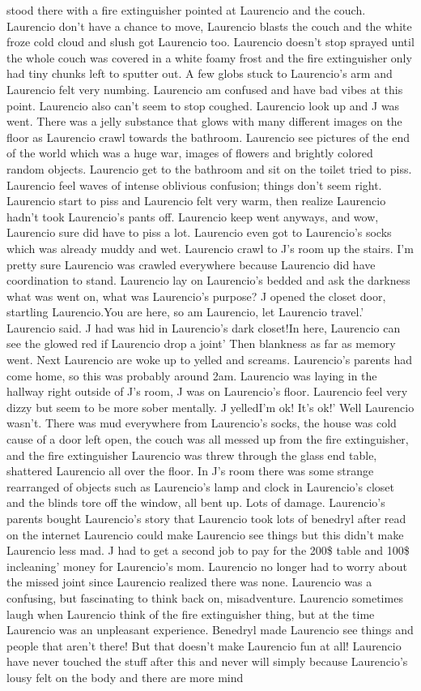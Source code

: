 \documentclass[12pt]{book}
\begin{document}
stood there with a fire extinguisher pointed at Laurencio and the couch. Laurencio don't have a chance to move, Laurencio blasts the couch and the white froze cold cloud and slush got Laurencio too. Laurencio doesn't stop sprayed until the whole couch was covered in a white foamy frost and the fire extinguisher only had tiny chunks left to sputter out. A few globs stuck to Laurencio's arm and Laurencio felt very numbing. Laurencio am confused and have bad vibes at this point. Laurencio also can't seem to stop coughed. Laurencio look up and J was went. There was a jelly substance that glows with many different images on the floor as Laurencio crawl towards the bathroom. Laurencio see pictures of the end of the world which was a huge war, images of flowers and brightly colored random objects. Laurencio get to the bathroom and sit on the toilet tried to piss. Laurencio feel waves of intense oblivious confusion; things don't seem right. Laurencio start to piss and Laurencio felt very warm, then realize Laurencio hadn't took Laurencio's pants off. Laurencio keep went anyways, and wow, Laurencio sure did have to piss a lot. Laurencio even got to Laurencio's socks which was already muddy and wet. Laurencio crawl to J's room up the stairs. I'm pretty sure Laurencio was crawled everywhere because Laurencio did have coordination to stand. Laurencio lay on Laurencio's bedded and ask the darkness what was went on, what was Laurencio's purpose? J opened the closet door, startling Laurencio.You are here, so am Laurencio, let Laurencio travel.' Laurencio said. J had was hid in Laurencio's dark closet!In here, Laurencio can see the glowed red if Laurencio drop a joint' Then blankness as far as memory went. Next Laurencio are woke up to yelled and screams. Laurencio's parents had come home, so this was probably around 2am. Laurencio was laying in the hallway right outside of J's room, J was on Laurencio's floor. Laurencio feel very dizzy but seem to be more sober mentally. J yelledI'm ok! It's ok!' Well Laurencio wasn't. There was mud everywhere from Laurencio's socks, the house was cold cause of a door left open, the couch was all messed up from the fire extinguisher, and the fire extinguisher Laurencio was threw through the glass end table, shattered Laurencio all over the floor. In J's room there was some strange rearranged of objects such as Laurencio's lamp and clock in Laurencio's closet and the blinds tore off the window, all bent up. Lots of damage. Laurencio's parents bought Laurencio's story that Laurencio took lots of benedryl after read on the internet Laurencio could make Laurencio see things but this didn't make Laurencio less mad. J had to get a second job to pay for the 200\$ table and 100\$ incleaning' money for Laurencio's mom. Laurencio no longer had to worry about the missed joint since Laurencio realized there was none. Laurencio was a confusing, but fascinating to think back on, misadventure. Laurencio sometimes laugh when Laurencio think of the fire extinguisher thing, but at the time Laurencio was an unpleasant experience. Benedryl made Laurencio see things and people that aren't there! But that doesn't make Laurencio fun at all! Laurencio have never touched the stuff after this and never will simply because Laurencio's lousy felt on the body and there are more mind 
\end{document}
